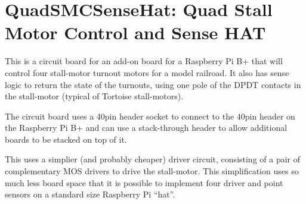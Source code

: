 %
%
%
%
% 
%
%
%
%
%
% 
%

\chapter{QuadSMCSenseHat: Quad Stall Motor Control and Sense HAT}

This is a circuit board for an add-on board for a Raspberry Pi B+ that will
control  four  stall-motor  turnout  motors for a model  railroad.  It also has
sense  logic to return the state of the  turnouts,  using one pole of the DPDT
contacts in the stall-motor (typical of Tortoise stall-motors).

The circuit board uses a 40pin header socket to connect to the 40pin header on
the  Raspberry Pi B+ and can use a  stack-through  header to allow  additional
boards to be stacked on top of it.

This uses a simplier (and probably cheaper) driver circuit, 
consisting of a pair of complementary MOS drivers to drive the stall-motor. 
This simplification uses so much less board space that it is possible to 
implement four driver and point sensors on a standard size Raspberry Pi 
``hat''.


